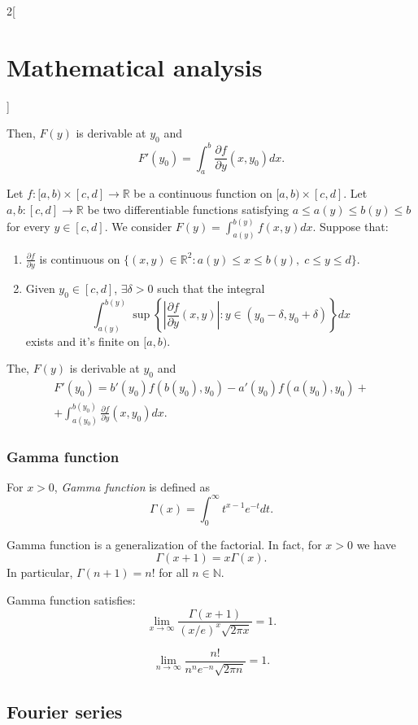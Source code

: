 \documentclass[../../../main.tex]{subfiles}
\begin{document}
\begin{multicols}{2}[\section{Mathematical analysis}]
\begin{theorem}
\begin{enumerate}
\end{enumerate} 
Then, $F(y)$ is derivable at $y_0$ and $$F'(y_0)=\int_a^b\frac{\partial f}{\partial y}(x,y_0)dx.$$
\end{theorem}
\begin{theorem}
Let $f:[a,b)\times[c,d]\rightarrow\mathbb{R}$ be a continuous function on $[a,b)\times[c,d]$. Let $a,b:[c,d]\rightarrow\mathbb{R}$ be two differentiable functions satisfying $a\leq a(y)\leq b(y)\leq b$ for every $y\in[c,d]$. We consider $\displaystyle F(y)=\int_{a(y)}^{b(y)}f(x,y)dx$. Suppose that:
\begin{enumerate}
    \item $\displaystyle\frac{\partial f}{\partial y}$ is continuous on $\{(x,y)\in\mathbb{R}^2:a(y)\leq x\leq b(y),\; c\leq y\leq d\}$.
    \item Given $y_0\in[c,d]$, $\exists\delta>0$ such that the integral $$\int_{a(y)}^{b(y)}\sup\left\{\left|\frac{\partial f}{\partial y}(x,y)\right|:y\in(y_0-\delta,y_0+\delta)\right\}dx$$ exists and it's finite on $[a,b)$.
\end{enumerate} 
The, $F(y)$ is derivable at $y_0$ and \begin{multline*}
    F'(y_0)=b'(y_0)f(b(y_0),y_0)-a'(y_0)f(a(y_0),y_0)+\\+\int_{a(y_0)}^{b(y_0)}\frac{\partial f}{\partial y}(x,y_0)dx.
\end{multline*}
\end{theorem}
\subsubsection*{Gamma function}
\begin{definition}
For $x>0$, \textit{Gamma function} is defined as $$\Gamma(x)=\int_0^\infty t^{x-1}e^{-t}dt.$$
\end{definition}
\begin{theorem}
Gamma function is a generalization of the factorial. In fact, for $x>0$ we have $$\Gamma(x+1)=x\Gamma(x).$$ In particular, $\Gamma(n+1)=n!$ for all $n\in\mathbb{N}$.
\end{theorem}
\begin{theorem}
Gamma function satisfies: $$\lim_{x\to\infty}\frac{\Gamma(x+1)}{(x/e)^x\sqrt{2\pi x}}=1.$$
\end{theorem}
\begin{corollary}
$$\lim_{n\to\infty}\frac{n!}{n^ne^{-n}\sqrt{2\pi n}}=1.$$
\end{corollary}
\subsection{Fourier series}

\end{multicols}
\end{document}
